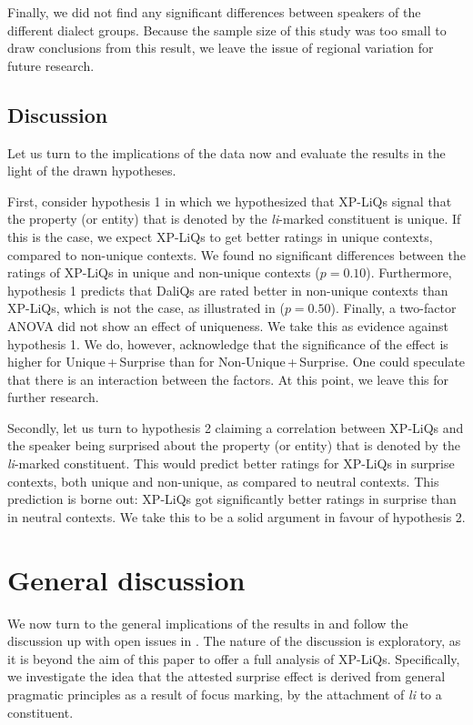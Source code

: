 \documentclass[output=paper]{langscibook}
\begin{document}
Finally, we did not find any significant differences between speakers of the different dialect groups. Because the sample size of this study was too small to draw conclusions from this result, we leave the issue of regional variation for future research.


\subsection{Discussion}\label{sec:discussion}
Let us turn to the implications of the data now and evaluate the results in the light of the drawn hypotheses.

First, consider hypothesis 1 in which we hypothesized that XP-LiQs signal that the property (or entity) that is denoted by the \textit{li}-marked constituent is unique. If this is the case, we expect XP-LiQs to get better ratings in unique contexts, compared to non-unique contexts. We found no significant differences between the ratings of XP-LiQs in unique and non-unique contexts ($p=0.10$). Furthermore, hypothesis 1 predicts that DaliQs are rated better in non-unique contexts than XP-LiQs, which is not the case, as illustrated in  ($p=0.50$). Finally, a two-factor ANOVA did not show an effect of uniqueness. We take this as evidence against hypothesis 1. We do, however, acknowledge that the significance of the effect is higher for Unique\,+\,Surprise than for Non-Unique\,+\,Surprise. One could speculate that there is an interaction between the factors. At this point, we leave this for further research.

Secondly, let us turn to hypothesis 2 claiming a correlation between XP-LiQs and the speaker being surprised about the property (or entity) that is denoted by the \textit{li}-marked constituent. This would predict better ratings for XP-LiQs in surprise contexts, both unique and non-unique, as compared to neutral contexts. This prediction is borne out: XP-LiQs got significantly better ratings in surprise than in neutral contexts. We take this to be a solid argument in favour of hypothesis 2.
\section{General discussion}\label{sec:analysis}
We now turn to the general implications of the results in  and follow the discussion up with open issues in . The nature of the discussion is exploratory, as it is beyond the aim of this paper to offer a full analysis of XP-LiQs. Specifically, we investigate the idea that the attested surprise effect is derived from general pragmatic principles as a result of focus marking, by the attachment of \textit{li} to a constituent.
\end{document}
